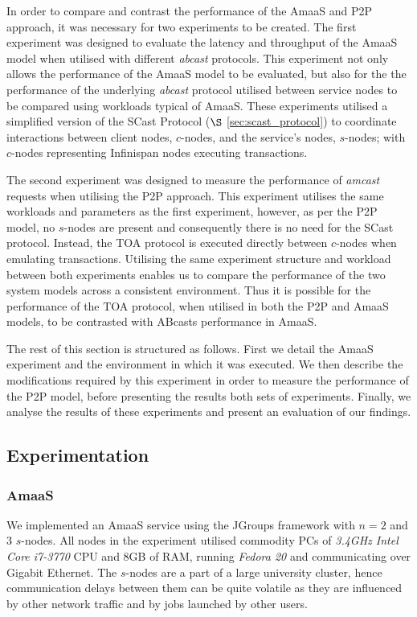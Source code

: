    In order to compare and contrast the performance of the \textsf{AmaaS} and P2P approach, it was necessary for two experiments to be created.  The first experiment was designed to evaluate the latency and throughput of the \textsf{AmaaS} model when utilised with different \emph{abcast} protocols.  This experiment not only allows the performance of the \textsf{AmaaS} model to be evaluated, but also for the the performance of the underlying \emph{abcast} protocol utilised between service nodes to be compared using workloads typical of \textsf{AmaaS}.  These experiments utilised a simplified version of the \textsf{SCast} Protocol ($\S$ \ref{sec:scast_protocol}) to coordinate interactions between client nodes, $c$-nodes, and the service's nodes, $s$-nodes; with $c$-nodes representing Infinispan nodes executing transactions.  
   
   The second experiment was designed to measure the performance of \emph{amcast} requests when utilising the P2P approach.  This experiment utilises the same workloads and parameters as the first experiment, however, as per the P2P model, no $s$-nodes are present and consequently there is no need for the \textsf{SCast} protocol.  Instead, the TOA protocol is executed directly between $c$-nodes when emulating transactions.  Utilising the same experiment structure and workload between both experiments enables us to compare the performance of the two system models across a consistent environment.  Thus it is possible for the performance of the TOA protocol, when utilised in both the P2P and \textsf{AmaaS} models, to be contrasted with \textsf{ABcast}s performance in \textsf{AmaaS}.  
	
	The rest of this section is structured as follows.  First we detail the \textsf{AmaaS} experiment and the environment in which it was executed.  We then describe the modifications required by this experiment in order to measure the performance of the P2P model, before presenting the results both sets of experiments.  Finally, we analyse the results of these experiments and present an evaluation of our findings.  
		
	\subsection{Experimentation}
	\subsubsection*{AmaaS}
	We implemented an \textsf{AmaaS} service using the JGroups\citep{JGroups} framework with $n=2$ and $3$ $s$-nodes.  All nodes in the experiment utilised commodity PCs of \emph{3.4GHz Intel Core i7-3770} CPU and 8GB of RAM, running \emph{Fedora 20} and communicating over Gigabit Ethernet. The $s$-nodes are a part of a large university cluster, hence communication delays between them can be quite volatile as they are influenced by other network traffic and by jobs launched by other users.
	

